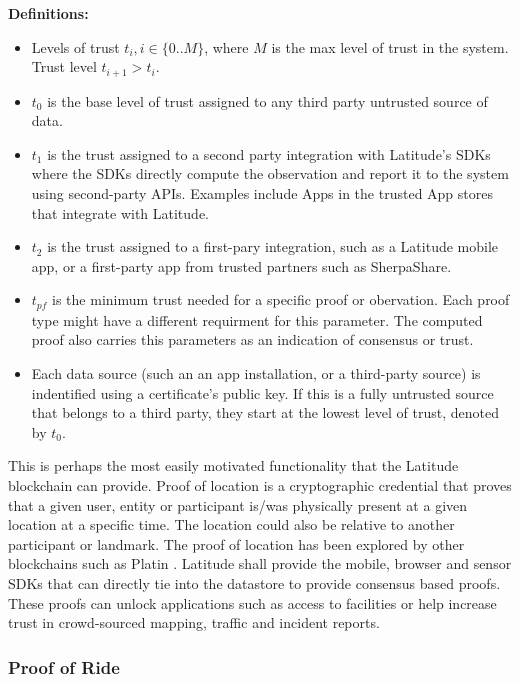 \noindent
{\bf Definitions:}
\begin{itemize}
    \item Levels of trust $t_i, i \in \{0..M\}$, where $M$ is the max level of trust in the system. Trust level $t_{i+1} >
        t_i$.
    \item $t_0$ is the base level of trust assigned to any third party untrusted source of data.
    \item $t_1$ is the trust assigned to a second party integration with Latitude's SDKs where the SDKs directly compute the
        observation and report it to the system using second-party APIs. Examples include Apps in the trusted App stores
        that integrate with Latitude.
    \item $t_2$ is the trust assigned to a first-pary integration, such as a Latitude mobile app, or a first-party app
        from trusted partners such as SherpaShare.
    \item $t_{pf}$ is the minimum trust needed for a specific proof or obervation. Each proof type might have a
        different requirment for this parameter. The computed proof also carries this parameters as an indication of
        consensus or trust.
\end{itemize}

\begin{itemize}
    \item Each data source (such an an app installation, or a third-party source) is indentified using a certificate's
        public key. If this is a fully untrusted source that belongs to a third party, they start at the lowest level of
        trust, denoted by $t_0$.
\end{itemize}

This is perhaps the most easily motivated functionality that the Latitude blockchain can provide. Proof of location is a
cryptographic credential that proves that a given user, entity or participant is/was physically present at a given
location at a specific time. The location could also be relative to another participant or landmark. The proof of
location has been explored by other blockchains such as Platin \cite{platin}. Latitude shall provide the mobile, browser
and sensor SDKs that can directly tie into the datastore to provide consensus based proofs. These proofs can unlock
applications such as access to facilities or help increase trust in crowd-sourced mapping, traffic and incident reports.

\subsubsection{Proof of Ride}
